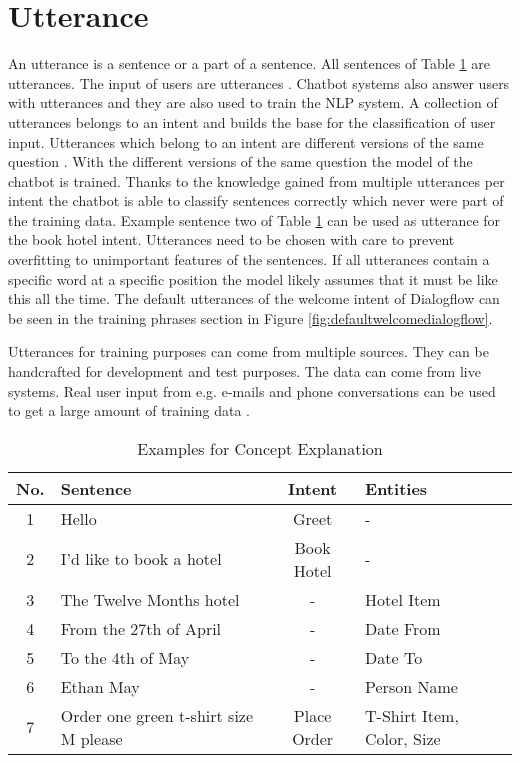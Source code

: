 \section{Utterance} \label{sec:utterance}
An utterance is a sentence or a part of a sentence.
All sentences of Table \ref{tab:example_sentences} are utterances.
The input of users are utterances \cite{singhbuilding, dutta2017developing}.
Chatbot systems also answer users with utterances and they are also used to train the NLP system.
A collection of utterances belongs to an intent and builds the base for the classification of user input.
Utterances which belong to an intent are different versions of the same question \cite{buiildChatbotsPython}.
With the different versions of the same question the model of the chatbot is trained.
Thanks to the knowledge gained from multiple utterances per intent the chatbot is able to
classify sentences correctly which never were part of the training data.
Example sentence two of Table \ref{tab:example_sentences} can be used as utterance for the book hotel intent.
Utterances need to be chosen with care to prevent overfitting to unimportant features of the sentences.
If all utterances contain a specific word at a specific position the model likely assumes that it must be like this all the time.
The default utterances of the welcome intent of Dialogflow can be seen in the training phrases section in Figure \ref{fig:defaultwelcomedialogflow}.

Utterances for training purposes can come from multiple sources.
They can be handcrafted for development and test purposes.
The data can come from live systems.
Real user input from e.g. e-mails and phone conversations can be used to get a large amount of training data \cite{singhbuilding}.    


\begin{table}[H]
    \centering
    \begin{tabular}{ c | l | c | l }
        No. & Sentence & Intent & Entities \\ \hline \hline
        1 & Hello & Greet & - \\ \hline
        2 & I'd like to book a hotel & Book Hotel & - \\ \hline
        3 & The Twelve Months hotel & - & Hotel Item\\ \hline
        4 & From the 27th of April & - & Date From\\ \hline
        5 & To the 4th of May & - & Date To\\ \hline
        6 & Ethan May & - & Person Name\\ \hline
        7 & Order one green t-shirt size M please & Place Order & T-Shirt Item, Color, Size \\ \hline
    \end{tabular}
    \caption{Examples for Concept Explanation} \label{tab:example_sentences}
\end{table} \noindent

